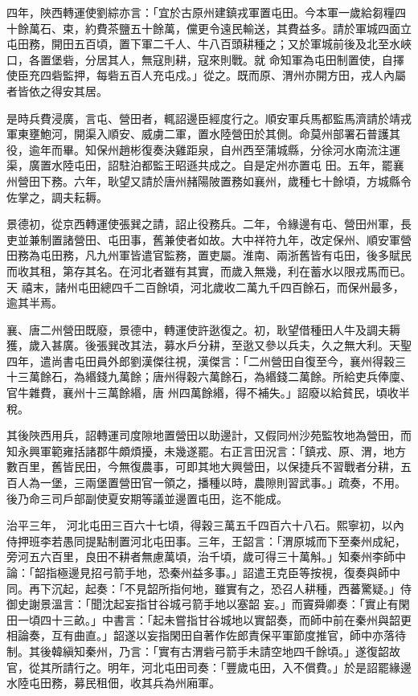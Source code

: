 \begin{pinyinscope}
 四年，陜西轉運使劉綜亦言：「宜於古原州建鎮戎軍置屯田。今本軍一歲給芻糧四十餘萬石、束，約費茶鹽五十餘萬，儻更令遠民輸送，其費益多。請於軍城四面立屯田務，開田五百頃，置下軍二千人、牛八百頭耕種之；又於軍城前後及北至水峽口，各置堡砦，分居其人，無寇則耕，寇來則戰。就
 命知軍為屯田制置使，自擇使臣充四砦監押，每砦五百人充屯戍。」從之。既而原、渭州亦開方田，戎人內屬者皆依之得安其居。



 是時兵費浸廣，言屯、營田者，輒詔邊臣經度行之。順安軍兵馬都監馬濟請於靖戎軍東壅鮑河，開渠入順安、威虜二軍，置水陸營田於其側。命莫州部署石普護其役，逾年而畢。知保州趙彬復奏決雞距泉，自州西至蒲城縣，分徐河水南流注運渠，廣置水陸屯田，詔駐泊都監王昭遜共成之。自是定州亦置屯
 田。五年，罷襄州營田下務。六年，耿望又請於唐州赭陽陂置務如襄州，歲種七十餘頃，方城縣令佐掌之，調夫耘耨。



 景德初，從京西轉運使張巽之請，詔止役務兵。二年，令緣邊有屯、營田州軍，長吏並兼制置諸營田、屯田事，舊兼使者如故。大中祥符九年，改定保州、順安軍營田務為屯田務，凡九州軍皆遣官監務，置吏屬。淮南、兩浙舊皆有屯田，後多賦民而收其租，第存其名。在河北者雖有其實，而歲入無幾，利在蓄水以限戎馬而已。天
 禧末，諸州屯田總四千二百餘頃，河北歲收二萬九千四百餘石，而保州最多，逾其半焉。



 襄、唐二州營田既廢，景德中，轉運使許逖復之。初，耿望借種田人牛及調夫耨獲，歲入甚廣。後張巽改其法，募水戶分耕，至逖又參以兵夫，久之無大利。天聖四年，遣尚書屯田員外郎劉漢傑往視，漢傑言：「二州營田自復至今，襄州得穀三十三萬餘石，為緡錢九萬餘；唐州得穀六萬餘石，為緡錢二萬餘。所給吏兵俸廩、官牛雜費，襄州十三萬餘緡，唐
 州四萬餘緡，得不補失。」詔廢以給貧民，頃收半稅。



 其後陜西用兵，詔轉運司度隙地置營田以助邊計，又假同州沙苑監牧地為營田，而知永興軍範雍括諸郡牛頗煩擾，未幾遂罷。右正言田況言：「鎮戎、原、渭，地方數百里，舊皆民田，今無復農事，可即其地大興營田，以保捷兵不習戰者分耕，五百人為一堡，三兩堡置營田官一領之，播種以時，農隙則習武事。」疏奏，不用。後乃命三司戶部副使夏安期等議並邊置屯田，迄不能成。



 治平三年，
 河北屯田三百六十七頃，得穀三萬五千四百六十八石。熙寧初，以內侍押班李若愚同提點制置河北屯田事。三年，王韶言：「渭原城而下至秦州成紀，旁河五六百里，良田不耕者無慮萬頃，治千頃，歲可得三十萬斛。」知秦州李師中論：「韶指極邊見招弓箭手地，恐秦州益多事。」詔遣王克臣等按視，復奏與師中同。再下沉起，起奏：「不見韶所指何地，雖實有之，恐召人耕種，西蕃驚疑。」侍御史謝景溫言：「聞沈起妄指甘谷城弓箭手地以塞韶
 妄。」而竇舜卿奏：「實止有閑田一頃四十三畝。」中書言：「起未嘗指甘谷城地以實韶奏，而師中前在秦州與韶更相論奏，互有曲直。」韶遂以妄指閑田自著作佐郎責保平軍節度推官，師中亦落待制。其後韓縝知秦州，乃言：「實有古渭砦弓箭手未請空地四千餘頃。」遂復韶故官，從其所請行之。明年，河北屯田司奏：「豐歲屯田，入不償費。」於是詔罷緣邊水陸屯田務，募民租佃，收其兵為州廂軍。




\end{pinyinscope}
